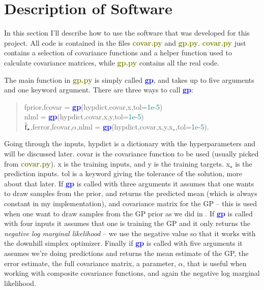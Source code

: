 \documentclass[a4paper,11pt,article,oneside]{memoir}
\newcommand{\pyt}[1]{\textbf{\textcolor{olive}{#1}}}
\newcommand{\dt}[1]{\textcolor{teal}{#1}}
\newcommand{\func}[1]{\textbf{\textcolor{blue}{#1}}}
\newcommand{\va}[1]{\textcolor{nicered}{#1}}
\begin{document}
\chapter{Description of Software}
\label{sec:description}

In this section I'll describe how to use the software that was developed for this project. All code is contained in the files \pyt{covar.py} and \pyt{gp.py}. \pyt{covar.py} just contains a selection of covariance functions and a helper function used to calculate covariance matrices, while \pyt{gp.py} contains all the real code.

The main function in \pyt{gp.py} is simply called \func{gp}, and takes up to five arguments and one keyword argument. There are three ways to call \func{gp}:
%
\begin{quote}
\va{fprior},\va{fcovar} = \func{gp}(\va{hypdict},\va{covar},\va{x},\va{tol}=\dt{1e-5}) \\
\va{nlml}               = \func{gp}(\va{hypdict},\va{covar},\va{x},\va{y},\va{tol}=\dt{1e-5}) \\
\va{$\bar{\textup{f}}_\star$},\va{ferror},\va{fcovar},\va{$\alpha$},\va{nlml} = \func{gp}(\va{hypdict},\va{covar},\va{x},\va{y},\va{x$_\star$},\va{tol}=\dt{1e-5}).
\end{quote}
%
Going through the inputs, \va{hypdict} is a dictionary with the hyperparameters and will be discussed later. \va{covar} is the covariance function to be used (usually picked from \pyt{covar.py}). \va{x} is the training inputs, and \va{y} is the training targets. \va{x$_\star$} is the prediction inputs. \va{tol} is a keyword giving the tolerance of the solution, more about that later. If \func{gp} is called with three arguments it assumes that one wants to draw samples from the prior, and returns the predicted mean (which is always constant in my implementation), and covariance matrix for the GP -- this is used when one want to draw samples from the GP prior as we did in . If \func{gp} is called with four inputs it assumes that one is training the GP and it only returns the \emph{negative log marginal likelihood} -- we use the negative value so that it works with the downhill simplex optimizer. Finally if \func{gp} is called with five arguments it assumes we're doing predictions and returns the mean estimate of the GP, the error estimate, the full covariance matrix, a parameter, \va{$\alpha$}, that is useful when working with composite covariance functions, and again the negative log marginal likelihood.
\end{document}
